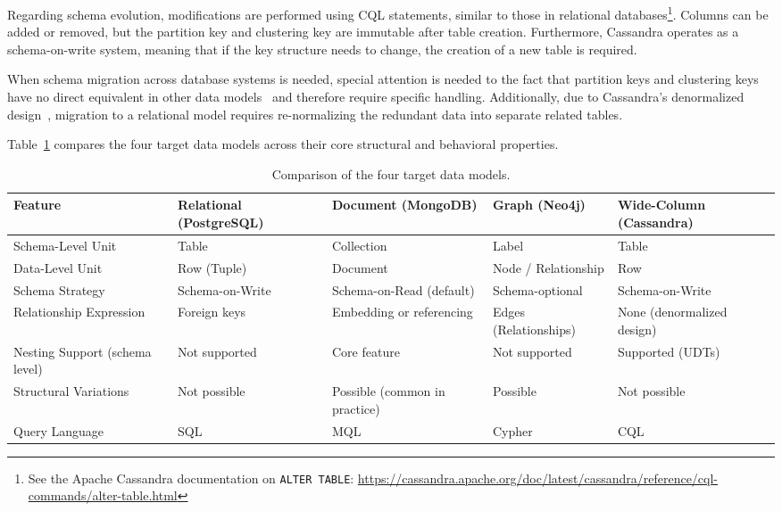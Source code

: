 Regarding schema evolution, modifications are performed using CQL
statements, similar to those in relational
databases\footnote{See the Apache Cassandra documentation on
\texttt{ALTER TABLE}:
\url{https://cassandra.apache.org/doc/latest/cassandra/reference/cql-commands/alter-table.html}}.
Columns can be added or removed, but the partition key and clustering
key are immutable after table creation. Furthermore, Cassandra
operates as a schema-on-write system, meaning that if the key
structure needs to change, the creation of a new table is required.

When schema migration across database systems is needed, special attention is needed to the fact that partition keys and clustering
keys have no direct equivalent in other data
models~\cite{lu2019multi} and therefore require specific handling.
Additionally, due to Cassandra's denormalized
design~\cite{carpenter2022cassandra}, migration to a relational model
requires re-normalizing the redundant data into separate related
tables.

Table~\ref{tab:datamodel-comparison} compares the four target data models
across their core structural and behavioral properties.

\begin{table}[ht!]
\centering
\caption{Comparison of the four target data models.}
\label{tab:datamodel-comparison}
\renewcommand{\arraystretch}{1.5}
\setlength{\tabcolsep}{6pt}
\footnotesize
\begin{tabularx}{\textwidth}{@{} p{2.8cm} X X X X @{}}
\toprule
\textbf{Feature} & \textbf{Relational (PostgreSQL)} & \textbf{Document (MongoDB)} & \textbf{Graph (Neo4j)} & \textbf{Wide-Column (Cassandra)} \\
\midrule
Schema-Level Unit & Table & Collection & Label & Table \\
\addlinespace
Data-Level Unit & Row (Tuple) & Document & Node / Relationship & Row \\
\addlinespace
Schema Strategy & Schema-on-Write & Schema-on-Read (default) & Schema-optional & Schema-on-Write \\
\addlinespace
Relationship Expression & Foreign keys & Embedding or referencing & Edges (Relationships) & None (denormalized design) \\
\addlinespace
Nesting Support (schema level) & Not supported & Core feature & Not supported & Supported (UDTs) \\
\addlinespace
Structural Variations & Not possible & Possible (common in practice) & Possible & Not possible \\
\addlinespace
Query Language & SQL & MQL & Cypher & CQL \\
\bottomrule
\end{tabularx}
\end{table}



